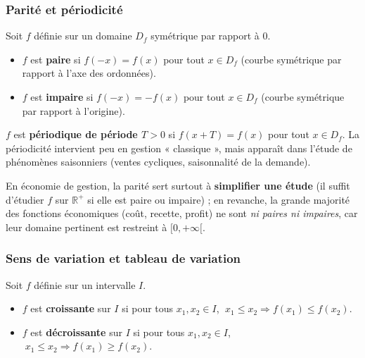 \documentclass[12pt,a4paper]{article}
\begin{document}
\subsubsection{Parité et périodicité}

\begin{definitionbox}[Parité]
Soit $f$ définie sur un domaine $D_f$ symétrique par rapport à $0$.
\begin{itemize}[leftmargin=1.2cm]
  \item $f$ est \textbf{paire} si $f(-x) = f(x)$ pour tout $x \in D_f$ (courbe symétrique par rapport à l'axe des ordonnées).
  \item $f$ est \textbf{impaire} si $f(-x) = -f(x)$ pour tout $x \in D_f$ (courbe symétrique par rapport à l'origine).
\end{itemize}
\end{definitionbox}

\begin{definitionbox}[Périodicité]
$f$ est \textbf{périodique de période $T>0$} si $f(x+T)=f(x)$ pour tout $x \in D_f$. La périodicité intervient peu en gestion « classique », mais apparaît dans l'étude de phénomènes saisonniers (ventes cycliques, saisonnalité de la demande).
\end{definitionbox}

\begin{gestionbox}
En économie de gestion, la parité sert surtout à \textbf{simplifier une étude} (il suffit d'étudier $f$ sur $\mathbb{R}^+$ si elle est paire ou impaire) ; en revanche, la grande majorité des fonctions économiques (coût, recette, profit) ne sont \emph{ni paires ni impaires}, car leur domaine pertinent est restreint à $[0,+\infty[$.
\end{gestionbox}

\subsubsection{Sens de variation et tableau de variation}

\begin{definitionbox}
Soit $f$ définie sur un intervalle $I$.
\begin{itemize}[leftmargin=1.2cm]
  \item $f$ est \textbf{croissante} sur $I$ si pour tous $x_1, x_2 \in I$, $\;x_1 \leqslant x_2 \Rightarrow f(x_1)\leqslant f(x_2)$.
  \item $f$ est \textbf{décroissante} sur $I$ si pour tous $x_1, x_2 \in I$, $\;x_1 \leqslant x_2 \Rightarrow f(x_1)\geqslant f(x_2)$.
\end{itemize}
\end{definitionbox}
\end{document}
